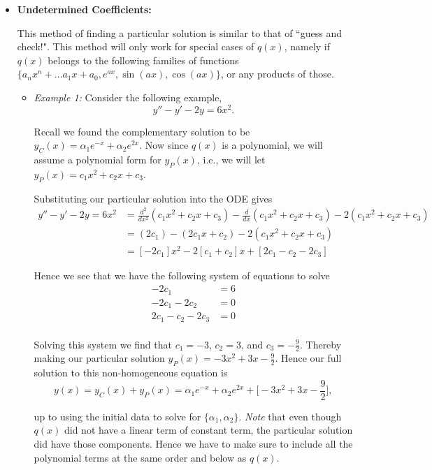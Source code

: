 \begin{itemize}
%
%
\item {\bf{Undetermined Coefficients:}}

This method of finding a particular solution is similar to that of ``guess and check!". This method will only work for special cases of $q(x)$, namely if $q(x)$ belongs to the following families of functions $\{ a_n x^n +\ldots a_1 x+a_0, e^{ax}, \sin(ax),\cos(ax)\}$, or any products of those. 

\begin{itemize}
\item \emph{Example 1:} Consider the following example, $$y'' - y' - 2y = 6x^2.$$

Recall we found the complementary solution to be $y_C(x) = \alpha_1 e^{-x} + \alpha_2 e^{2x}.$ Now since $q(x)$ is a polynomial, we will assume a polynomial form for $y_P(x)$, i.e., we will let $y_P(x) = c_1 x^2 + c_2 x + c_3.$

Substituting our particular solution into the ODE gives
\begin{align*}
y''-y'-2y= 6x^2 &= \frac{d^2}{dx^2}(c_1 x^2 + c_2 x + c_3) - \frac{d}{dx} ( c_1 x^2 + c_2 x + c_3) - 2(c_1 x^2 + c_2 x + c_3) \\
&= (2c_1) - (2 c_1 x + c_2) - 2(c_1 x^2 + c_2 x + c_3) \\
&= [-2 c_1] x^2 - 2[ c_1 + c_2 ]x + [2c_1 - c_2 -2c_3] 
\end{align*}

Hence we see that we have the following system of equations to solve
\begin{align*}
-2 c_1 &= 6 \\
-2c_1 - 2 c_2 &= 0 \\
2c_1 - c_2 - 2c_3 &= 0\\
\end{align*}

Solving this system we find that $c_1 = -3$, $c_2 = 3$, and $c_3 = -\frac{9}{2}.$ Thereby making our particular solution $y_P(x) = -3x^2+3x-\frac{9}{2}.$ Hence our full solution to this non-homogeneous equation is
$$y(x) = y_C(x) + y_P(x) =  \alpha_1 e^{-x} + \alpha_2 e^{2x} + \Big[-3x^2+3x-\frac{9}{2}\Big],$$

up to using the initial data to solve for $\{\alpha_1,\alpha_2\}.$ \emph{Note} that even though $q(x)$ did not have a linear term of constant term, the particular solution did have those components. Hence we have to make sure to include all the polynomial terms at the same order and below as $q(x)$.
\end{itemize}


\end{itemize}

